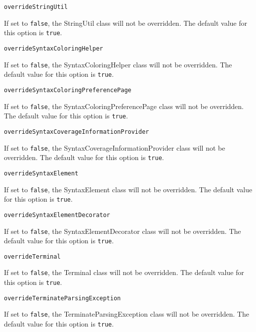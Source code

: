 \noindent\texttt{overrideStringUtil}
\begin{myindentpar}{1cm}
If set to \texttt{false}, the StringUtil class will not be overridden. The default value for this option is \texttt{true}.
\end{myindentpar}

\noindent\texttt{overrideSyntaxColoringHelper}
\begin{myindentpar}{1cm}
If set to \texttt{false}, the SyntaxColoringHelper class will not be overridden. The default value for this option is \texttt{true}.
\end{myindentpar}

\noindent\texttt{overrideSyntaxColoringPreferencePage}
\begin{myindentpar}{1cm}
If set to \texttt{false}, the SyntaxColoringPreferencePage class will not be overridden. The default value for this option is \texttt{true}.
\end{myindentpar}

\noindent\texttt{overrideSyntaxCoverageInformationProvider}
\begin{myindentpar}{1cm}
If set to \texttt{false}, the SyntaxCoverageInformationProvider class will not be overridden. The default value for this option is \texttt{true}.
\end{myindentpar}

\noindent\texttt{overrideSyntaxElement}
\begin{myindentpar}{1cm}
If set to \texttt{false}, the SyntaxElement class will not be overridden. The default value for this option is \texttt{true}.
\end{myindentpar}

\noindent\texttt{overrideSyntaxElementDecorator}
\begin{myindentpar}{1cm}
If set to \texttt{false}, the SyntaxElementDecorator class will not be overridden. The default value for this option is \texttt{true}.
\end{myindentpar}

\noindent\texttt{overrideTerminal}
\begin{myindentpar}{1cm}
If set to \texttt{false}, the Terminal class will not be overridden. The default value for this option is \texttt{true}.
\end{myindentpar}

\noindent\texttt{overrideTerminateParsingException}
\begin{myindentpar}{1cm}
If set to \texttt{false}, the TerminateParsingException class will not be overridden. The default value for this option is \texttt{true}.
\end{myindentpar}

